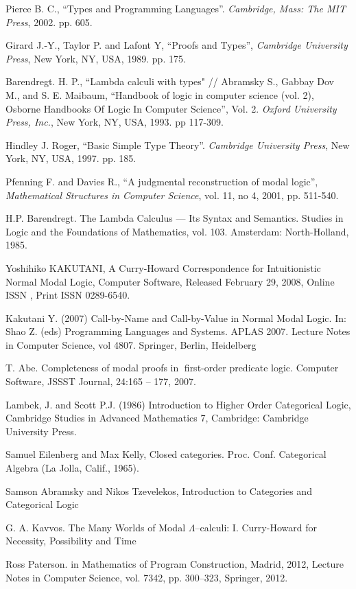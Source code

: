 \documentclass[a4paper]{article}
\begin{document}
\begin{thebibliography}{}
   Pierce B. C., ``Types and Programming Languages''. \textit{Cambridge, Mass: The MIT
  Press}, 2002. pp. 605. \parskip=1mm

   Girard J.-Y., Taylor P. and  Lafont Y, ``Proofs and Types'', \textit{Cambridge University
  Press}, New York, NY, USA, 1989. pp. 175. \parskip=1mm

   Barendregt. H. P., ``Lambda calculi with types" // Abramsky S., Gabbay Dov M., and S. E.
  Maibaum, ``Handbook of logic in computer science (vol. 2), Osborne Handbooks Of Logic In Computer
  Science'', Vol. 2. \textit{Oxford University Press, Inc.}, New York, NY, USA, 1993. pp 117-309.
  \parskip=1mm

   Hindley J. Roger, ``Basic Simple Type Theory''. \textit{Cambridge University Press}, New
  York, NY, USA, 1997. pp. 185. \parskip=1mm

   Pfenning F. and Davies R., ``A judgmental reconstruction of modal logic'',
  \textit{Mathematical Structures in Computer Science}, vol. 11, no 4, 2001, pp. 511-540. \parskip=1mm

   H.P. Barendregt. The Lambda Calculus --- Its Syntax and Semantics. Studies in Logic and
  the Foundations of Mathematics, vol. 103. Amsterdam: North-Holland, 1985.

   Yoshihiko KAKUTANI, A Curry-Howard Correspondence for Intuitionistic Normal Modal Logic, Computer Software, Released February 29, 2008, Online ISSN , Print ISSN 0289-6540.

   Kakutani Y. (2007) Call-by-Name and Call-by-Value in Normal Modal Logic. In: Shao Z. (eds) Programming Languages and Systems. APLAS 2007. Lecture Notes in Computer Science, vol 4807. Springer, Berlin, Heidelberg

   T. Abe. Completeness of modal proofs in first-order predicate logic. Computer Software, JSSST Journal, 24:165 -- 177, 2007.

   Lambek, J. and Scott P.J. (1986) Introduction to Higher Order Categorical Logic, Cambridge Studies in Advanced Mathematics 7, Cambridge: Cambridge University Press.

   Samuel Eilenberg and Max Kelly, Closed categories. Proc. Conf. Categorical Algebra (La Jolla, Calif., 1965).

   Samson Abramsky and Nikos Tzevelekos, Introduction to Categories and Categorical Logic

   G. A. Kavvos. The Many Worlds of Modal $\Lambda$--calculi: I. Curry-Howard for Necessity, Possibility and Time

   Ross Paterson. in Mathematics of Program Construction, Madrid, 2012, Lecture Notes in Computer Science, vol. 7342, pp. 300--323, Springer, 2012.
\end{thebibliography}
\end{document}
